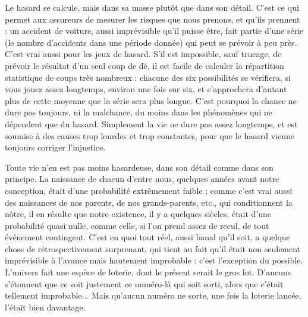 Le hasard se calcule, mais dans sa masse plutôt que dans son détail. C’est ce
qui permet aux assureurs de mesurer les risques que nous prenons, et qu’ils
prennent : un accident de voiture, aussi imprévisible qu’il puisse être, fait partie
d’une série (le nombre d’accidents dans une période donnée) qui peut se prévoir
à peu près. C’est vrai aussi pour les jeux de hasard. S’il est impossible, sauf
trucage, de prévoir le résultat d’un seul coup de dé, il est facile de calculer la
répartition statistique de coups très nombreux : chacune des six possibilités se
vérifiera, si vous jouez assez longtemps, environ une fois sur six, et s’approchera
d'autant plus de cette moyenne que la série sera plus longue. C’est pourquoi la
chance ne dure pas toujours, ni la malchance, du moins dans les phénomènes
qui ne dépendent que du hasard. Simplement la vie ne dure pas assez longtemps,
et est soumise à des causes trop lourdes et trop constantes, pour que le
hasard vienne toujours corriger l’injustice.

Toute vie n’en est pas moins hasardeuse, dans son détail comme dans son
principe. La naissance de chacun d’entre nous, quelques années avant notre
conception, était d’une probabilité extrêmement faible ; comme c’est vrai aussi
des naissances de nos parents, de nos grands-parents, etc., qui conditionnent la
nôtre, il en résulte que notre existence, il y a quelques siècles, était d’une probabilité
quasi nulle, comme celle, si l’on prend assez de recul, de tout événement
contingent. C’est en quoi tout réel, aussi banal qu’il soit, a quelque chose
de rétrospectivement surprenant, qui tient au fait qu’il était non seulement
imprévisible à l'avance mais hautement improbable : c’est l'exception du possible.
L'univers fait une espèce de loterie, dont le présent serait le gros lot.
D’aucuns s’étonnent que ce soit justement ce numéro-là qui soit sorti, alors
que c'était tellement improbable... Mais qu'aucun numéro ne sorte, une fois la
loterie lancée, l’était bien davantage.

